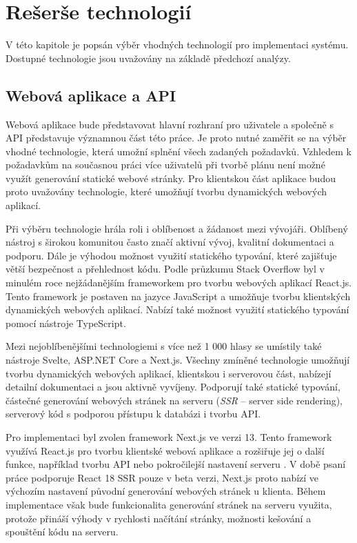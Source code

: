 \chapter{Rešerše technologií}

V této kapitole je popsán výběr vhodných technologií pro implementaci systému. Dostupné technologie jsou uvažovány na základě předchozí analýzy.

\section{Webová aplikace a API}

Webová aplikace bude představovat hlavní rozhraní pro uživatele a společně s API představuje významnou část této práce.
Je proto nutné zaměřit se na výběr vhodné technologie, která umožní splnění všech zadaných požadavků.
Vzhledem k požadavkům na současnou práci více uživatelů při tvorbě plánu není možné využít generování statické webové stránky. Pro klientskou část
aplikace budou proto uvažovány technologie, které umožňují tvorbu dynamických webových aplikací.

Při výběru technologie hrála roli i oblíbenost a žádanost mezi vývojáři. Oblíbený nástroj s širokou komunitou často značí aktivní vývoj, kvalitní dokumentaci
a podporu. Dále je výhodou možnost využití statického typování, které zajišťuje větší bezpečnost a přehlednost kódu. Podle průzkumu Stack Overflow \cite{so_dev_survey} 
byl v minulém roce nejžádanějším frameworkem pro tvorbu webových aplikací React.js. Tento framework je postaven na jazyce JavaScript a umožňuje tvorbu klientských
dynamických webových aplikací. Nabízí také možnost využití statického typování pomocí nástroje TypeScript.

Mezi nejoblíbenějšími technologiemi s více než 1 000 hlasy se umístily také nástroje Svelte, ASP.NET Core a Next.js. Všechny zmíněné technologie umožňují tvorbu dynamických webových aplikací,
klientskou i serverovou část, nabízejí detailní dokumentaci a jsou aktivně vyvíjeny. Podporují také statické typování, částečné generování webových stránek na serveru (\textit{SSR} -- server side rendering),
serverový kód s podporou přístupu k databázi i tvorbu API.

Pro implementaci byl zvolen framework Next.js ve verzi 13. Tento framework využívá React.js pro tvorbu klientské webová aplikace a rozšiřuje jej o další funkce, například tvorbu API nebo pokročilejší nastavení serveru \cite{nextjs}.
V době psaní práce podporuje React 18 SSR pouze v beta verzi, Next.js proto nabízí ve výchozím nastavení původní generování webových stránek u klienta.
Během implementace však bude funkcionalita generování stránek na serveru využita, protože přináší výhody v rychlosti načítání stránky, možnosti kešování a spouštění kódu na serveru.

